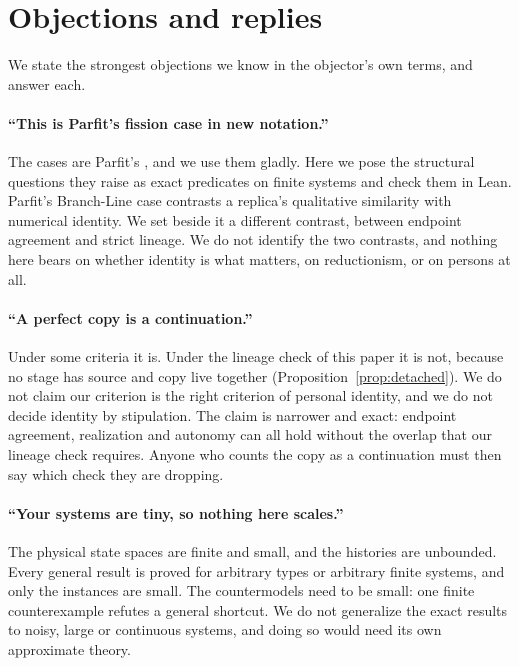 \section{Objections and replies}
\label{sec:objections}

We state the strongest objections we know in the objector's own terms, and
answer each.

\paragraph{``This is Parfit's fission case in new notation.''}
The cases are Parfit's \citep{Parfit1984}, and we use them gladly. Here we
pose the structural questions they raise as exact predicates on finite systems
and check them in Lean. Parfit's Branch-Line case contrasts a
replica's qualitative similarity with numerical identity. We set beside it a
different contrast, between endpoint agreement and strict lineage. We do not
identify the two contrasts, and nothing here bears on whether identity is what
matters, on reductionism, or on persons at all.

\paragraph{``A perfect copy is a continuation.''}
Under some criteria it is. Under the lineage check of this paper it is not,
because no stage has source and copy live together
(Proposition~\ref{prop:detached}). We do not claim our criterion is the right
criterion of personal identity, and we do not decide identity by stipulation.
The claim is narrower and exact: endpoint agreement, realization and autonomy
can all hold without the overlap that our lineage check requires. Anyone who
counts the copy as a continuation must then say which check they are
dropping.

\paragraph{``Your systems are tiny, so nothing here scales.''}
The physical state spaces are finite and small, and the histories are
unbounded. Every general result is proved for arbitrary types or arbitrary
finite systems, and only the instances are small. The countermodels need to be
small: one finite counterexample refutes a general shortcut. We do not
generalize the exact results to noisy, large or continuous systems, and doing
so would need its own approximate theory.

